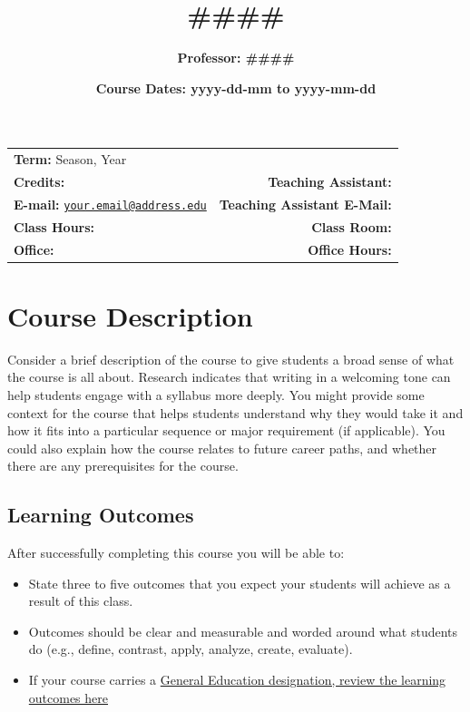 \documentclass[11pt]{article}
\title{\bfseries{\color{BrickRed}{Course Title:}} \#\#\#\#}
\author{\bfseries{Professor:} \#\#\#\#}
\date{\bfseries{Course Dates:} yyyy-dd-mm to yyyy-mm-dd}
\def\tightlist{}
\newcommand{\shrug}[1][]{%
\begin{tikzpicture}[baseline,x=0.8\ht\strutbox,y=0.8\ht\strutbox,line width=0.125ex,#1]
\def\arm{(-2.5,0.95) to (-2,0.95) (-1.9,1) to (-1.5,0) (-1.35,0) to (-0.8,0)};
\draw \arm;
\draw[xscale=-1] \arm;
\def\headpart{(0.6,0) arc[start angle=-40, end angle=40,x radius=0.6,y radius=0.8]};
\draw \headpart;
\draw[xscale=-1] \headpart;
\def\eye{(-0.075,0.15) .. controls (0.02,0) .. (0.075,-0.15)};
\draw[shift={(-0.3,0.8)}] \eye;
\draw[shift={(0,0.85)}] \eye;
\draw (-0.1,0.2) to [out=15,in=-100] (0.4,0.95);
\end{tikzpicture}}
\begin{document}
\maketitle


\noindent \begin{tabular*}{\textwidth}{ @{\extracolsep{\fill}} lr @{\extracolsep{\fill}}}

\textbf{Term:} Season, Year \\
\textbf{Credits:} \shrug & \textbf{Teaching Assistant:} \shrug \\
\textbf{E-mail:} \texttt{\href{mailto:your.email@address.edu}{\nolinkurl{your.email@address.edu}}} & \textbf{Teaching Assistant E-Mail:} \shrug \\
\textbf{Class Hours:} \shrug & \textbf{Class Room:} \shrug \\
\textbf{Office:} \shrug & \textbf{Office Hours:} \shrug \\
	\end{tabular*}

\vspace{2mm}





\hypertarget{course-description}{%
\section{Course Description}\label{course-description}}

Consider a brief description of the course to give students a broad
sense of what the course is all about. Research indicates that writing
in a welcoming tone can help students engage with a syllabus more
deeply. You might provide some context for the course that helps
students understand why they would take it and how it fits into a
particular sequence or major requirement (if applicable). You could also
explain how the course relates to future career paths, and whether there
are any prerequisites for the course.

\hypertarget{learning-outcomes}{%
\subsection{Learning Outcomes}\label{learning-outcomes}}

After successfully completing this course you will be able to:

\begin{itemize}
\tightlist
\item
  State three to five outcomes that you expect your students will
  achieve as a result of this class.
\item
  Outcomes should be clear and measurable and worded around what
  students do (e.g., define, contrast, apply, analyze, create,
  evaluate).
\item
  If your course carries a
  \href{https://gened.umd.edu/faculty/general-education-learning-outcomes-and-assessment-rubrics}{General
  Education designation, review the learning outcomes here}
\end{itemize}
\end{document}
